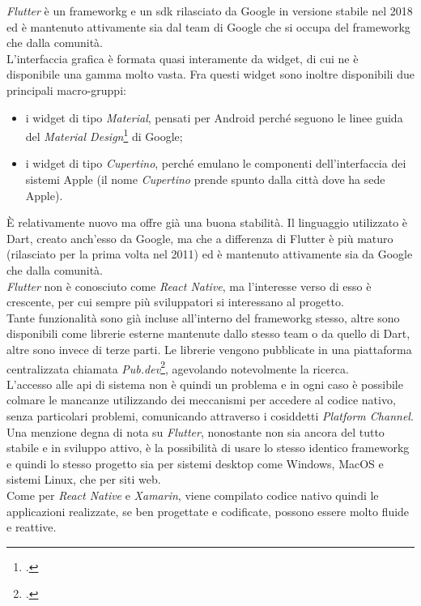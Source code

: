 \emph{Flutter} è un \gls{frameworkg} e un \gls{sdk} rilasciato da Google in versione stabile nel 2018 ed è mantenuto attivamente sia dal team di Google che si occupa del \gls{frameworkg} che dalla comunità.\\
L'interfaccia grafica è formata quasi interamente da widget, di cui ne è disponibile una gamma molto vasta. Fra questi widget sono inoltre disponibili due principali macro-gruppi:
\begin{itemize}
    \item i widget di tipo \emph{Material}, pensati per Android perché seguono le linee guida del \emph{Material Design}\footcite{site:material-design} di Google;
    \item i widget di tipo \emph{Cupertino}, perché emulano le componenti dell'interfaccia dei sistemi Apple (il nome \emph{Cupertino} prende spunto dalla città dove ha sede Apple).
\end{itemize}
È relativamente nuovo ma offre già una buona stabilità. Il linguaggio utilizzato è Dart, creato anch'esso da Google, ma che a differenza di Flutter è più maturo (rilasciato per la prima volta nel 2011) ed è mantenuto attivamente sia da Google che dalla comunità.\\
\emph{Flutter} non è conosciuto come \emph{React Native}, ma l'interesse verso di esso è crescente, per cui sempre più sviluppatori si interessano al progetto.\\
Tante funzionalità sono già incluse all'interno del \gls{frameworkg} stesso, altre sono disponibili come librerie esterne mantenute dallo stesso team o da quello di Dart, altre sono invece di terze parti. Le librerie vengono pubblicate in una piattaforma centralizzata chiamata \emph{Pub.dev}\footcite{site:pub-dev}, agevolando notevolmente la ricerca.\\
L'accesso alle \gls{api} di sistema non è quindi un problema e in ogni caso è possibile colmare le mancanze utilizzando dei meccanismi per accedere al codice nativo, senza particolari problemi, comunicando attraverso i cosiddetti \emph{Platform Channel}.\\
Una menzione degna di nota su \emph{Flutter}, nonostante non sia ancora del tutto stabile e in sviluppo attivo, è la possibilità di usare lo stesso identico \gls{frameworkg} e quindi lo stesso progetto sia per sistemi desktop come Windows, MacOS e sistemi Linux, che per siti web.\\
Come per \emph{React Native} e \emph{Xamarin}, viene compilato codice nativo quindi le applicazioni realizzate, se ben progettate e codificate, possono essere molto fluide e reattive.

